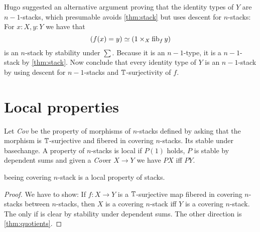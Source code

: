 \documentclass{article}
\newcommand{\Cov}{\emph{Cov} }
\newcommand{\Cover}{\emph{Cov}er }
\begin{document}
\begin{rmk}
		Hugo suggested an alternative argument proving that the identity types of $Y$ are $n-1$-stacks, which presumable avoids \ref{thm:stack} but uses descent for $n$-stacks: 
	For $x : X, y: Y$ we have that 
	\[
	(f(x) = y) \simeq (1 \times_X \operatorname{fib}_f y)
	\]
	is an $n$-stack by stability under $\sum$. Because it is an $n-1$-type, it is a $n-1$-stack by \ref{thm:stack}. Now conclude that every identity type of $Y$ is an $n-1$-stack by using descent for $n-1$-stacks and $\mathbb{T}$-surjectivity of $f$.
\end{rmk}
\section{Local properties}

\begin{definition}
Let \Cov be the property of morphisms of  $n$-stacks defined by asking that the morphism is $\mathbb{T}$-surjective and fibered in covering $n$-stacks. Its stable under basechange. A property of  $n$-stacks is local if $P(1)$ holds, $P$ is stable by dependent sums and given a \Cover  $X \to Y$ we have $P X$ iff $P Y$.
\end{definition}
\begin{example}    
    beeing covering $n$-stack is a local property of stacks.
\end{example}
\begin{proof}
    We have to show: If $f : X \to Y$ is a $\mathbb{T}$-surjective map fibered in covering $n$-stacks between  $n$-stacks, then $X$ is a covering $n$-stack iff $Y$ is a covering $n$-stack.
    The only if is clear by stability under dependent sums. The other direction is \ref{thm:quotients}.
    
\end{proof}
\end{document}
